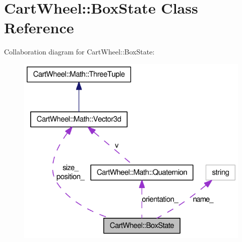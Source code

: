 \hypertarget{classCartWheel_1_1BoxState}{
\section{CartWheel::BoxState Class Reference}
\label{classCartWheel_1_1BoxState}
}


Collaboration diagram for CartWheel::BoxState:\nopagebreak
\begin{figure}[H]
\begin{center}
\leavevmode
\includegraphics[width=321pt]{classCartWheel_1_1BoxState__coll__graph}
\end{center}
\end{figure}
